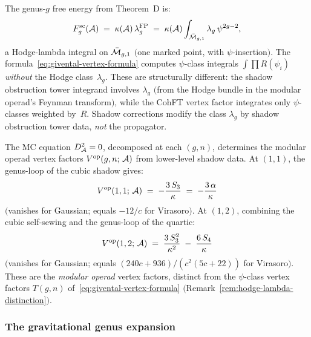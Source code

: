 \begin{remark}%
\label{rem:hodge-lambda-distinction}%
%
The genus-$g$ free energy from Theorem~D is:
\begin{equation}\label{eq:fg-hodge-lambda}
F_g^{\mathrm{sc}}(\mathcal{A})
\;=\;
\kappa(\mathcal{A})\,\lambda_g^{\mathrm{FP}}
\;=\;
\kappa(\mathcal{A})
\int_{\bar{\mathcal{M}}_{g,1}}
\lambda_g\,\psi^{2g-2},
\end{equation}
a Hodge-lambda integral on $\bar{\mathcal{M}}_{g,1}$
$($one marked point, with $\psi$-insertion$)$.
The formula~\eqref{eq:givental-vertex-formula}
computes $\psi$-class integrals
$\int \prod R(\psi_i)$ \emph{without} the
Hodge class~$\lambda_g$. These are structurally
different: the shadow obstruction tower integrand involves
$\lambda_g$ $($from the Hodge bundle in the modular
operad's Feynman transform$)$, while the CohFT
vertex factor integrates only $\psi$-classes
weighted by~$R$. Shadow corrections
modify the class $\lambda_g$ by shadow obstruction tower data,
\emph{not} the propagator.
\end{remark}

\begin{remark}%
\label{rem:operad-vertex-factors}%
%
The MC equation $D_{\mathcal{A}}^2 = 0$, decomposed at each
$(g,n)$, determines the modular operad vertex factors
$V^{\mathrm{op}}(g,n;\,\mathcal{A})$ from lower-level shadow data.
At $(1,1)$, the genus-loop of the cubic shadow gives:
\begin{equation}\label{eq:V11-mc}
V^{\mathrm{op}}(1,1;\,\mathcal{A})
\;=\;
-\frac{3\,S_3}{\kappa}
\;=\;
-\frac{3\,\alpha}{\kappa}
\end{equation}
$($vanishes for Gaussian; equals $-12/c$ for Virasoro$)$.
At $(1,2)$, combining the cubic self-sewing and the
genus-loop of the quartic:
\begin{equation}\label{eq:V12-mc}
V^{\mathrm{op}}(1,2;\,\mathcal{A})
\;=\;
\frac{3\,S_3^2}{\kappa^2}
\;-\;
\frac{6\,S_4}{\kappa}
\end{equation}
$($vanishes for Gaussian; equals
$(240c{+}936)/(c^2(5c{+}22))$ for Virasoro$)$.
These are the \emph{modular operad} vertex factors,
distinct from the $\psi$-class vertex factors $T(g,n)$
of~\eqref{eq:givental-vertex-formula}
$($Remark~\ref{rem:hodge-lambda-distinction}$)$.
\end{remark}

\subsubsection{The gravitational genus expansion}
\label{subsubsec:gravitational-genus-expansion}

